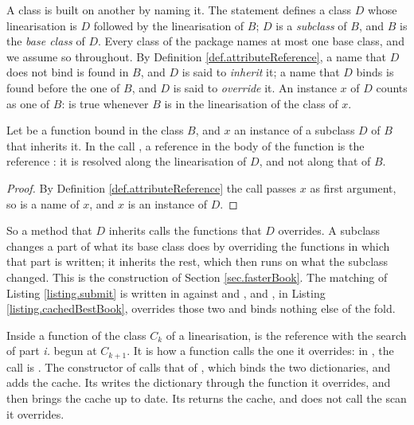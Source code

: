 A class is built on another by naming it.
The statement  defines a class $D$
whose linearisation is $D$ followed by the linearisation of $B$;
$D$ is a \emph{subclass} of $B$, and $B$ is the \emph{base class} of $D$.
Every class of the package names at most one base class, and we assume so throughout.
By Definition \ref{def.attributeReference},
a name that $D$ does not bind is found in $B$, and $D$ is said to \emph{inherit} it;
a name that $D$ binds is found before the one of $B$, and $D$ is said to \emph{override} it.
An instance $x$ of $D$ counts as one of $B$:
 is true whenever $B$ is in the linearisation of the class of $x$.

\begin{prop}\label{prop.lateBinding}
 Let  be a function bound in the class $B$,
 and $x$ an instance of a subclass $D$ of $B$ that inherits it.
 In the call , a reference  in the body of the function
 is the reference :
 it is resolved along the linearisation of $D$, and not along that of $B$.
\end{prop}
\begin{proof}
 By Definition \ref{def.attributeReference} the call passes $x$ as first argument,
 so  is a name of $x$, and $x$ is an instance of $D$.
\end{proof}

So a method that $D$ inherits calls the functions that $D$ overrides.
A subclass changes a part of what its base class does
by overriding the functions in which that part is written;
it inherits the rest, which then runs on what the subclass changed.
This is the construction of Section \ref{sec.fasterBook}.
The matching of Listing \ref{listing.submit} is written in 
against  and ,
and , in Listing \ref{listing.cachedBestBook},
overrides those two and binds nothing else of the fold.

Inside a function of the class $C_k$ of a linearisation,
 is the reference 
with the search of part \emph{i.} begun at $C_{k+1}$.
It is how a function calls the one it overrides:
in , the call 
is .
The constructor of  calls that of ,
which binds the two dictionaries, and adds the cache.
Its  writes the dictionary through the function it overrides,
and then brings the cache up to date.
Its  returns the cache, and does not call the scan it overrides.

